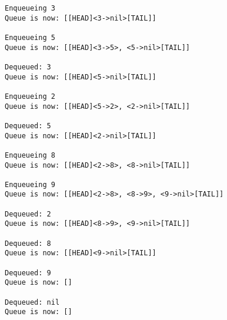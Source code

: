 \documentclass[a4paper]{scrartcl}
\begin{document}
\begin{lstlisting}
Enqueueing 3
Queue is now: [[HEAD]<3->nil>[TAIL]]

Enqueueing 5
Queue is now: [[HEAD]<3->5>, <5->nil>[TAIL]]

Dequeued: 3
Queue is now: [[HEAD]<5->nil>[TAIL]]

Enqueueing 2
Queue is now: [[HEAD]<5->2>, <2->nil>[TAIL]]

Dequeued: 5
Queue is now: [[HEAD]<2->nil>[TAIL]]

Enqueueing 8
Queue is now: [[HEAD]<2->8>, <8->nil>[TAIL]]

Enqueueing 9
Queue is now: [[HEAD]<2->8>, <8->9>, <9->nil>[TAIL]]

Dequeued: 2
Queue is now: [[HEAD]<8->9>, <9->nil>[TAIL]]

Dequeued: 8
Queue is now: [[HEAD]<9->nil>[TAIL]]

Dequeued: 9
Queue is now: []

Dequeued: nil
Queue is now: []
\end{lstlisting}
\end{document}
